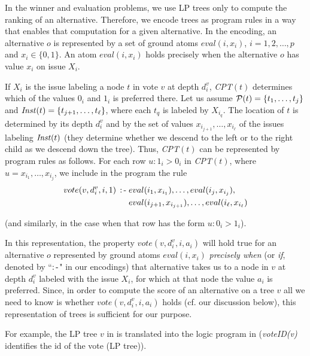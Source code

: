 In the winner and evaluation problems, we use LP trees only to compute
the ranking of an alternative. Therefore, we encode trees as program rules
in a way that enables that computation for a given alternative. In the
encoding, an alternative $o$ is represented by a set of ground atoms 
$eval(i,x_i)$, $i=1,2,\ldots,p$ and $x_i \in\{0,1\}$. An atom $eval(i,x_i)$
holds precisely when the alternative $o$ has value $x_i$ on issue $X_i$.

If $X_i$ is the issue labeling a node $t$ in vote $v$
at depth $d^v_i$, \textit{CPT}$(t)$ determines
which of the values $0_i$ and $1_i$ is preferred there. Let us assume
$\mathcal{P}(t) = \{t_1,\ldots, t_j\}$ and $\mathit{Inst}(t)=
\{t_{j+1},\ldots, t_\ell\}$, where each $t_q$ is labeled by $X_{i_q}$.
The location of $t$ is determined by its
depth $d^v_i$ and by the set of values $x_{i_{j+1}},\ldots,x_{i_\ell}$ of the
issues labeling $\mathit{Inst}(t)$ (they determine whether we descend to the left or
to the right child as we descend down the tree). Thus, \textit{CPT}$(t)$ can be
represented by program rules as follows. For each row $u : 1_i > 0_i$
in \textit{CPT}$(t)$, where $u=x_{i_1},\ldots,x_{i_j}$, we include in the program
the rule
\begin{equation} \label{eq:localPrefASP}
\begin{split}
  \small
  vote(v,d^v_i,i,1) \; \operatorname{:-} \; &eval(i_1,x_{i_1}), \ldots, eval(i_j,x_{i_j}), \\
    &eval(i_{j+1},x_{i_{j+1}}), \ldots, eval(i_\ell,x_{i_\ell})
\end{split}
  \end{equation}

(and similarly, in the case when that row has the form $u : 0_i > 1_i$).
 
In this representation, the property $vote(v,d^v_i,i,a_i)$ will hold true
for an alternative $o$ represented by ground atoms $eval(i,x_i)$ \textit{precisely
when} (or \textit{if}, denoted by ``$\operatorname{:-}$" in our encodings) that alternative 
takes us to a node in $v$ at depth $d^v_i$ labeled with 
the issue $X_i$, for which at that node the value $a_i$ is preferred.
Since, in order to compute the score of an
alternative on a tree $v$ all we need to know is whether $vote(v,d^v_i,i,a_i)$
holds (cf. our discussion below), this representation of trees is 
sufficient for our purpose.

For example, the LP tree $v$ in  
is translated into the logic program in  
(\textit{voteID(v)} identifies the id of the vote (LP tree)).

